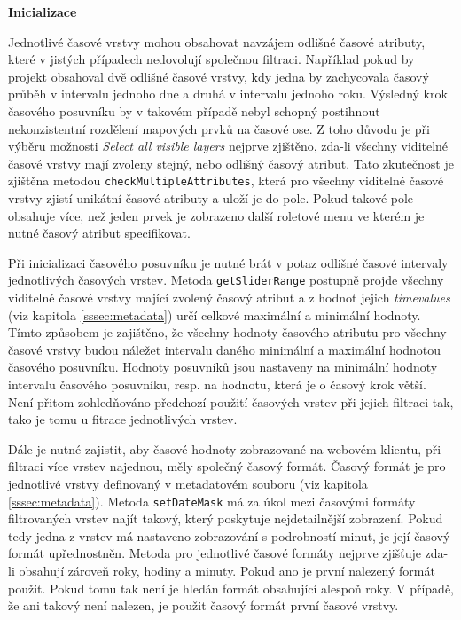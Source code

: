 \bigskip
\noindent \textbf{Inicializace}

Jednotlivé časové vrstvy mohou obsahovat navzájem odlišné
časové atributy, které v jistých případech nedovolují společnou
filtraci. Například pokud by projekt obsahoval dvě odlišné časové
vrstvy, kdy jedna by zachycovala časový průběh v intervalu jednoho dne
a druhá v intervalu jednoho roku. Výsledný krok časového posuvníku by
v takovém případě nebyl schopný postihnout nekonzistentní rozdělení
mapových prvků na časové ose. Z toho důvodu je při výběru možnosti
\textit{Select all visible layers} nejprve zjištěno, zda-li všechny
viditelné časové vrstvy mají zvoleny stejný, nebo odlišný časový
atribut. Tato zkutečnost je zjištěna metodou \verb|checkMultipleAttributes|,
která pro všechny viditelné časové vrstvy zjistí unikátní časové
atributy a uloží je do pole. Pokud takové pole obsahuje více, než jeden
prvek je zobrazeno další roletové menu ve kterém je nutné časový
atribut specifikovat.

Při inicializaci časového posuvníku je nutné brát v potaz
odlišné časové intervaly jednotlivých časových vrstev. Metoda
\verb|getSliderRange| postupně projde všechny viditelné
časové vrstvy mající zvolený časový atribut a z hodnot jejich
\textit{time\textunderscore values} (viz kapitola \ref{sssec:metadata}) určí
celkové maximální a minimální hodnoty. Tímto způsobem je zajištěno,
že všechny hodnoty časového atributu pro všechny časové vrstvy budou
náležet intervalu daného minimální a maximální hodnotou časového
posuvníku. Hodnoty posuvníků jsou nastaveny na minimální hodnoty
intervalu časového posuvníku, resp. na hodnotu, která je o časový
krok větší. Není přitom zohledňováno předchozí použití časových
vrstev při jejich filtraci tak, tako je tomu u fitrace jednotlivých vrstev.

Dále je nutné zajistit, aby časové hodnoty zobrazované na webovém
klientu, při filtraci více vrstev najednou, měly společný časový
formát. Časový formát je pro jednotlivé vrstvy definovaný v metadatovém
souboru (viz kapitola \ref{sssec:metadata}). Metoda \verb|setDateMask|
má za úkol mezi časovými formáty filtrovaných vrstev najít takový,
který poskytuje nejdetailnější zobrazení. Pokud tedy jedna z vrstev
má nastaveno zobrazování s podrobností minut, je její časový
formát upřednostněn. Metoda pro jednotlivé časové formáty nejprve
zjišťuje zda-li obsahují zároveň roky, hodiny a minuty. Pokud ano je
první nalezený formát použit. Pokud tomu tak není je hledán formát
obsahující alespoň roky. V případě, že ani takový není nalezen,
je použit časový formát první časové vrstvy.

